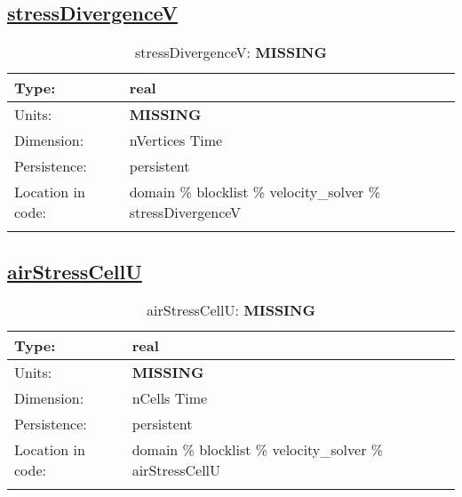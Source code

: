 \subsection[stressDivergenceV]{\hyperref[sec:var_tab_velocity_solver]{stressDivergenceV}}
\label{subsec:var_sec_velocity_solver_stressDivergenceV}
\begin{center}
\begin{longtable}{| p{2.0in} | p{4.0in} |}
        \hline 
        Type: & real \\
        \hline 
        Units: & {\bf \color{red} MISSING} \\
        \hline 
        Dimension: & nVertices Time \\
        \hline 
        Persistence: & persistent \\
        \hline 
         Location in code: & domain \% blocklist \% velocity\_solver \% stressDivergenceV \\
         \hline 
    \caption{stressDivergenceV: {\bf \color{red} MISSING}}
\end{longtable}
\end{center}
\subsection[airStressCellU]{\hyperref[sec:var_tab_velocity_solver]{airStressCellU}}
\label{subsec:var_sec_velocity_solver_airStressCellU}
\begin{center}
\begin{longtable}{| p{2.0in} | p{4.0in} |}
        \hline 
        Type: & real \\
        \hline 
        Units: & {\bf \color{red} MISSING} \\
        \hline 
        Dimension: & nCells Time \\
        \hline 
        Persistence: & persistent \\
        \hline 
         Location in code: & domain \% blocklist \% velocity\_solver \% airStressCellU \\
         \hline 
    \caption{airStressCellU: {\bf \color{red} MISSING}}
\end{longtable}
\end{center}
